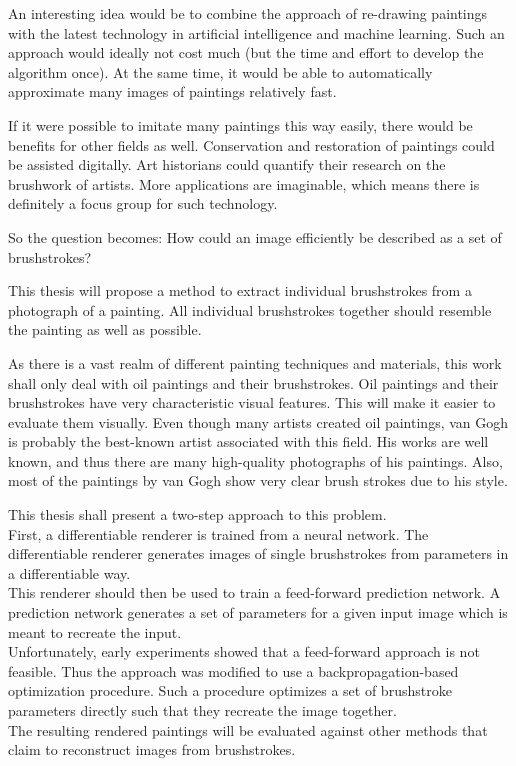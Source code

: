 An interesting idea would be to combine the approach of re-drawing paintings with the latest technology in artificial intelligence and machine learning.
Such an approach would ideally not cost much (but the time and effort to develop the algorithm once).
At the same time, it would be able to automatically approximate many images of paintings relatively fast.

If it were possible to imitate many paintings this way easily, there would be benefits for other fields as well.
Conservation and restoration of paintings could be assisted digitally.
Art historians could quantify their research on the brushwork of artists.
More applications are imaginable, which means there is definitely a focus group for such technology.

So the question becomes: How could an image efficiently be described as a set of brushstrokes?

This thesis will propose a method to extract individual brushstrokes from a photograph of a painting.
All individual brushstrokes together should resemble the painting as well as possible.

As there is a vast realm of different painting techniques and materials, this work shall only deal with oil paintings and their brushstrokes.
Oil paintings and their brushstrokes have very characteristic visual features.
This will make it easier to evaluate them visually.
Even though many artists created oil paintings, van Gogh is probably the best-known artist associated with this field.
His works are well known, and thus there are many high-quality photographs of his paintings.
Also, most of the paintings by van Gogh show very clear brush strokes due to his style.

This thesis shall present a two-step approach to this problem.\\
First, a differentiable renderer is trained from a neural network.
The differentiable renderer generates images of single brushstrokes from parameters in a differentiable way.\\
This renderer should then be used to train a feed-forward prediction network.
A prediction network generates a set of parameters for a given input image which is meant to recreate the input.\\
Unfortunately, early experiments showed that a feed-forward approach is not feasible.
Thus the approach was modified to use a backpropagation-based optimization procedure.
Such a procedure optimizes a set of brushstroke parameters directly such that they recreate the image together.\\
The resulting rendered paintings will be evaluated against other methods that claim to reconstruct images from brushstrokes.


